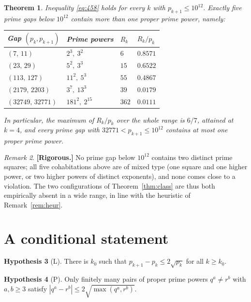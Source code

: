 \documentclass[11pt]{amsart}
\newtheorem{theorem}{Theorem}[section]
\theoremstyle{definition}
\newtheorem{hypothesis}[theorem]{Hypothesis}
\theoremstyle{remark}
\newtheorem{remark}[theorem]{Remark}
\begin{document}
\begin{theorem}\label{thm:verif}
Inequality \eqref{eq:458} holds for every $k$ with $p_{k+1}\le 10^{12}$. Exactly five prime gaps below $10^{12}$ contain more than one proper prime power, namely:
\begin{center}
\begin{tabular}{@{}llll@{}}
\toprule
Gap $(p_k,p_{k+1})$ & Prime powers & $R_k$ & $R_k/p_k$ \\
\midrule
$(7,\,11)$        & $2^3,\ 3^2$        & $6$    & $0.8571$ \\
$(23,\,29)$       & $5^2,\ 3^3$        & $15$   & $0.6522$ \\
$(113,\,127)$     & $11^2,\ 5^3$       & $55$   & $0.4867$ \\
$(2179,\,2203)$   & $3^7,\ 13^3$       & $39$   & $0.0179$ \\
$(32749,\,32771)$ & $181^2,\ 2^{15}$   & $362$  & $0.0111$ \\
\bottomrule
\end{tabular}
\end{center}
In particular, the maximum of $R_k/p_k$ over the whole range is $6/7$, attained at $k=4$, and every prime gap with $32771<p_{k+1}\le 10^{12}$ contains at most one proper prime power.
\end{theorem}

\begin{remark}
\textbf{[Rigorous.]} No prime gap below $10^{12}$ contains two distinct prime squares; all five cohabitations above are of mixed type (one square and one higher power, or two higher powers of distinct exponents), and none comes close to a violation. The two configurations of Theorem~\ref{thm:class} are thus both empirically absent in a wide range, in line with the heuristic of Remark~\ref{rem:heur}.
\end{remark}

\section{A conditional statement}

\begin{hypothesis}[L]\label{hyp:L}
There is $k_0$ such that $p_{k+1}-p_k\le 2\sqrt{p_k}$ for all $k\ge k_0$.
\end{hypothesis}

\begin{hypothesis}[P]\label{hyp:P}
Only finitely many pairs of proper prime powers $q^a\ne r^b$ with $a,b\ge3$ satisfy $|q^a-r^b|\le 2\sqrt{\max(q^a,r^b)}$.
\end{hypothesis}
\end{document}
